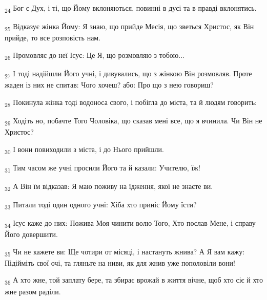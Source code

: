 \begin{tcolorbox}
\textsubscript{24} Бог є Дух, і ті, що Йому вклоняються, повинні в дусі та в правді вклонятись.
\end{tcolorbox}
\begin{tcolorbox}
\textsubscript{25} Відказує жінка Йому: Я знаю, що прийде Месія, що зветься Христос, як Він прийде, то все розповість нам.
\end{tcolorbox}
\begin{tcolorbox}
\textsubscript{26} Промовляє до неї Ісус: Це Я, що розмовляю з тобою...
\end{tcolorbox}
\begin{tcolorbox}
\textsubscript{27} І тоді надійшли Його учні, і дивувались, що з жінкою Він розмовляв. Проте жаден із них не спитав: Чого хочеш? або: Про що з нею говориш?
\end{tcolorbox}
\begin{tcolorbox}
\textsubscript{28} Покинула жінка тоді водоноса свого, і побігла до міста, та й людям говорить:
\end{tcolorbox}
\begin{tcolorbox}
\textsubscript{29} Ходіть но, побачте Того Чоловіка, що сказав мені все, що я вчинила. Чи Він не Христос?
\end{tcolorbox}
\begin{tcolorbox}
\textsubscript{30} І вони повиходили з міста, і до Нього прийшли.
\end{tcolorbox}
\begin{tcolorbox}
\textsubscript{31} Тим часом же учні просили Його та й казали: Учителю, їж!
\end{tcolorbox}
\begin{tcolorbox}
\textsubscript{32} А Він їм відказав: Я маю поживу на їдження, якої не знаєте ви.
\end{tcolorbox}
\begin{tcolorbox}
\textsubscript{33} Питали тоді один одного учні: Хіба хто приніс Йому їсти?
\end{tcolorbox}
\begin{tcolorbox}
\textsubscript{34} Ісус каже до них: Пожива Моя чинити волю Того, Хто послав Мене, і справу Його довершити.
\end{tcolorbox}
\begin{tcolorbox}
\textsubscript{35} Чи не кажете ви: Ще чотири от місяці, і настануть жнива? А Я вам кажу: Підійміть свої очі, та гляньте на ниви, як для жнив уже пополовіли вони!
\end{tcolorbox}
\begin{tcolorbox}
\textsubscript{36} А хто жне, той заплату бере, та збирає врожай в життя вічне, щоб хто сіє й хто жне разом раділи.
\end{tcolorbox}
